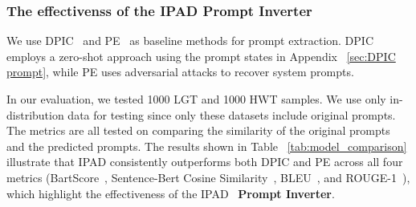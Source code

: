 
\subsubsection{The effectivenss of the IPAD \textbf{Prompt Inverter}}

We use DPIC~\cite{r62} and PE~\cite{r65} as baseline methods for prompt extraction. DPIC employs a zero-shot approach using the prompt states in Appendix ~\ref{sec:DPIC prompt}, while PE uses adversarial attacks to recover system prompts.

In our evaluation, we tested 1000 LGT and 1000 HWT samples. We use only in-distribution data for testing since only these datasets include original prompts. The metrics are all tested on comparing the similarity of the original prompts and the predicted prompts. The results shown in Table ~\ref{tab:model_comparison} illustrate that IPAD consistently outperforms both DPIC and PE across all four metrics (BartScore~\cite{r64}, Sentence-Bert Cosine Similarity~\cite{r63}, BLEU~\cite{r66}, and ROUGE-1~\cite{r67}), which highlight the effectiveness of the IPAD ~\textbf{Prompt Inverter}.

